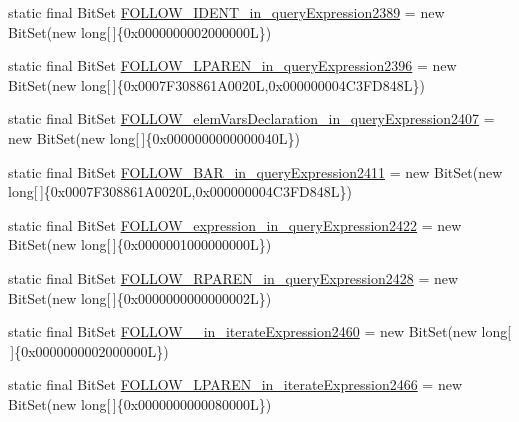 \begin{DoxyCompactItemize}
static final Bit\-Set \hyperlink{classorg_1_1tzi_1_1use_1_1parser_1_1shell_1_1_shell_command_parser_a96f782f0b1c4c0a23d9440ae5efbd2d2}{F\-O\-L\-L\-O\-W\-\_\-\-I\-D\-E\-N\-T\-\_\-in\-\_\-query\-Expression2389} = new Bit\-Set(new long\mbox{[}$\,$\mbox{]}\{0x0000000002000000\-L\})
\item 
static final Bit\-Set \hyperlink{classorg_1_1tzi_1_1use_1_1parser_1_1shell_1_1_shell_command_parser_ac4dca1d56d60b3d5a33241e14bff916a}{F\-O\-L\-L\-O\-W\-\_\-\-L\-P\-A\-R\-E\-N\-\_\-in\-\_\-query\-Expression2396} = new Bit\-Set(new long\mbox{[}$\,$\mbox{]}\{0x0007\-F308861\-A0020\-L,0x000000004\-C3\-F\-D848\-L\})
\item 
static final Bit\-Set \hyperlink{classorg_1_1tzi_1_1use_1_1parser_1_1shell_1_1_shell_command_parser_a213eddb681e6193ffe8795514ecc9394}{F\-O\-L\-L\-O\-W\-\_\-elem\-Vars\-Declaration\-\_\-in\-\_\-query\-Expression2407} = new Bit\-Set(new long\mbox{[}$\,$\mbox{]}\{0x0000000000000040\-L\})
\item 
static final Bit\-Set \hyperlink{classorg_1_1tzi_1_1use_1_1parser_1_1shell_1_1_shell_command_parser_afd3202283f84a28aae0e72e2f691fbe1}{F\-O\-L\-L\-O\-W\-\_\-\-B\-A\-R\-\_\-in\-\_\-query\-Expression2411} = new Bit\-Set(new long\mbox{[}$\,$\mbox{]}\{0x0007\-F308861\-A0020\-L,0x000000004\-C3\-F\-D848\-L\})
\item 
static final Bit\-Set \hyperlink{classorg_1_1tzi_1_1use_1_1parser_1_1shell_1_1_shell_command_parser_af7383a5f64e6267a2e55e668df85c821}{F\-O\-L\-L\-O\-W\-\_\-expression\-\_\-in\-\_\-query\-Expression2422} = new Bit\-Set(new long\mbox{[}$\,$\mbox{]}\{0x0000001000000000\-L\})
\item 
static final Bit\-Set \hyperlink{classorg_1_1tzi_1_1use_1_1parser_1_1shell_1_1_shell_command_parser_a967c87c8d2db7e1a8a398cad53a68294}{F\-O\-L\-L\-O\-W\-\_\-\-R\-P\-A\-R\-E\-N\-\_\-in\-\_\-query\-Expression2428} = new Bit\-Set(new long\mbox{[}$\,$\mbox{]}\{0x0000000000000002\-L\})
\item 
static final Bit\-Set \hyperlink{classorg_1_1tzi_1_1use_1_1parser_1_1shell_1_1_shell_command_parser_a6be08b8a5b02c76976c4cd23bd08fdef}{F\-O\-L\-L\-O\-W\-\_\-\_\-in\-\_\-iterate\-Expression2460} = new Bit\-Set(new long\mbox{[}$\,$\mbox{]}\{0x0000000002000000\-L\})
\item 
static final Bit\-Set \hyperlink{classorg_1_1tzi_1_1use_1_1parser_1_1shell_1_1_shell_command_parser_a2d85a3ff0641a9372418248d366a2d73}{F\-O\-L\-L\-O\-W\-\_\-\-L\-P\-A\-R\-E\-N\-\_\-in\-\_\-iterate\-Expression2466} = new Bit\-Set(new long\mbox{[}$\,$\mbox{]}\{0x0000000000080000\-L\})

\end{DoxyCompactItemize}
